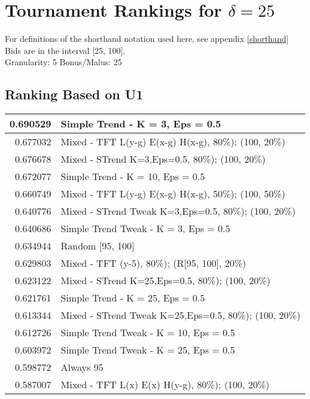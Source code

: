 \newpage  
\section{Tournament Rankings for $\delta = 25$}\label{results_25}
For definitions of the shorthand notation used here, see appendix \ref{shorthand} \\
\newline
Bids are in the interval [25, 100].\\
Granularity: 5\hspace{0.25in} Bonus/Malus: 25\\
\begin{table}[!hbtp]
\subsection{Ranking Based on U1}
\begin{footnotesize}
\begin{tabular}{|r|l|}\hline  \label{U3results}
0.690529 & Simple Trend - K = 3, Eps = 0.5\\ \hline
0.677032 & Mixed - {TFT L(y-g) E(x-g) H(x-g), 80\%); (100, 20\%)}\\ \hline
0.676678 & Mixed - {STrend K=3,Eps=0.5, 80\%); (100, 20\%)}\\ \hline
0.672077 & Simple Trend - K = 10, Eps = 0.5\\ \hline
0.660749 & Mixed - {TFT L(y-g) E(x-g) H(x-g), 50\%); (100, 50\%)}\\ \hline
0.640776 & Mixed - {STrend Tweak K=3,Eps=0.5, 80\%); (100, 20\%)}\\ \hline
0.640686 & Simple Trend Tweak - K = 3, Eps = 0.5\\ \hline
0.634944 & Random [95, 100]\\ \hline
0.629803 & Mixed - {TFT (y-5), 80\%); (R[95, 100], 20\%)}\\ \hline
0.623122 & Mixed - {STrend K=25,Eps=0.5, 80\%); (100, 20\%)}\\ \hline
0.621761 & Simple Trend - K = 25, Eps = 0.5\\ \hline
0.613344 & Mixed - {STrend Tweak K=25,Eps=0.5, 80\%); (100, 20\%)}\\ \hline
0.612726 & Simple Trend Tweak - K = 10, Eps = 0.5\\ \hline
0.603972 & Simple Trend Tweak - K = 25, Eps = 0.5\\ \hline
0.598772 & Always 95\\ \hline
0.587007 & Mixed - {TFT L(x) E(x) H(y-g), 80\%); (100, 20\%)}\\ \hline

\end{tabular}
\end{footnotesize}
\end{table}
